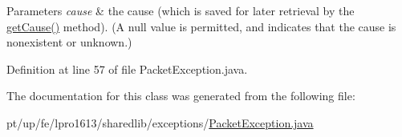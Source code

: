 \begin{DoxyParams}{Parameters}
{\em cause} & the cause (which is saved for later retrieval by the \hyperlink{}{get\+Cause()} method). (A {\ttfamily null} value is permitted, and indicates that the cause is nonexistent or unknown.) \\
\hline
\end{DoxyParams}


Definition at line 57 of file Packet\+Exception.\+java.



The documentation for this class was generated from the following file\+:\begin{DoxyCompactItemize}
\item 
pt/up/fe/lpro1613/sharedlib/exceptions/\hyperlink{_packet_exception_8java}{Packet\+Exception.\+java}\end{DoxyCompactItemize}
